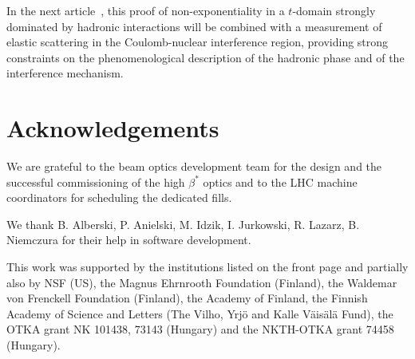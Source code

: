 \documentclass[3p,twocolumn]{elsarticle}
\begin{document}
In the next article~\cite{1km}, this proof of non-exponentiality in a 
$t$-domain strongly
dominated by hadronic interactions will be combined with a measurement of 
elastic scattering in the Coulomb-nuclear interference region, providing strong
constraints on the phenomenological description of the hadronic phase and of 
the interference mechanism.



\section*{Acknowledgements}
We are grateful to the beam optics development team for the design and the 
successful commissioning of the high $\beta^{*}$ optics and to the LHC machine 
coordinators for scheduling the dedicated fills.

We thank B. Alberski, P. Anielski, M. Idzik, I. Jurkowski, R. Lazarz, 
B. Niemczura for their help in software development.

This work was supported by the institutions listed on the front page and 
partially also by NSF (US), the Magnus Ehrnrooth Foundation (Finland), the 
Waldemar von Frenckell Foundation (Finland), the Academy of Finland, the 
Finnish Academy of Science and Letters (The Vilho, Yrj\"o and Kalle 
V\"ais\"al\"a Fund), the OTKA grant NK 101438, 73143 (Hungary) and the 
NKTH-OTKA grant 74458 (Hungary).
\end{document}

